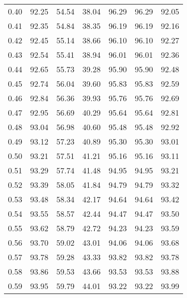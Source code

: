 \begin{tabular}{|c|c|c|c|c|c|c|}
      0.40 &     92.25 &     54.54 &      38.04 &   96.29 &      96.29 &         92.05 \\
      0.41 &     92.35 &     54.84 &      38.35 &   96.19 &      96.19 &         92.16 \\
      0.42 &     92.45 &     55.14 &      38.66 &   96.10 &      96.10 &         92.27 \\
      0.43 &     92.54 &     55.41 &      38.94 &   96.01 &      96.01 &         92.36 \\
      0.44 &     92.65 &     55.73 &      39.28 &   95.90 &      95.90 &         92.48 \\
      0.45 &     92.74 &     56.04 &      39.60 &   95.83 &      95.83 &         92.59 \\
      0.46 &     92.84 &     56.36 &      39.93 &   95.76 &      95.76 &         92.69 \\
      0.47 &     92.95 &     56.69 &      40.29 &   95.64 &      95.64 &         92.81 \\
      0.48 &     93.04 &     56.98 &      40.60 &   95.48 &      95.48 &         92.92 \\
      0.49 &     93.12 &     57.23 &      40.89 &   95.30 &      95.30 &         93.01 \\
      0.50 &     93.21 &     57.51 &      41.21 &   95.16 &      95.16 &         93.11 \\
      0.51 &     93.29 &     57.74 &      41.48 &   94.95 &      94.95 &         93.21 \\
      0.52 &     93.39 &     58.05 &      41.84 &   94.79 &      94.79 &         93.32 \\
      0.53 &     93.48 &     58.34 &      42.17 &   94.64 &      94.64 &         93.42 \\
      0.54 &     93.55 &     58.57 &      42.44 &   94.47 &      94.47 &         93.50 \\
      0.55 &     93.62 &     58.79 &      42.72 &   94.23 &      94.23 &         93.59 \\
      0.56 &     93.70 &     59.02 &      43.01 &   94.06 &      94.06 &         93.68 \\
      0.57 &     93.78 &     59.28 &      43.33 &   93.82 &      93.82 &         93.78 \\
      0.58 &     93.86 &     59.53 &      43.66 &   93.53 &      93.53 &         93.88 \\
      0.59 &     93.95 &     59.79 &      44.01 &   93.22 &      93.22 &         93.99 \\

\end{tabular}
